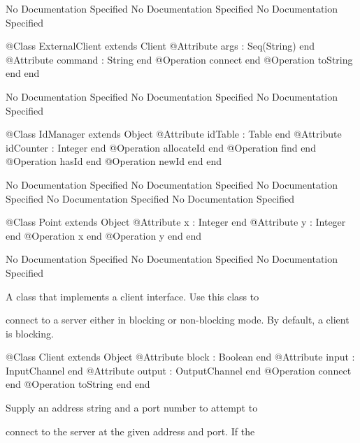 No Documentation Specified
No Documentation Specified
No Documentation Specified
\begin{Interface}
@Class ExternalClient extends Client
  @Attribute args : Seq(String) end
  @Attribute command : String end
  @Operation connect end
  @Operation toString end
end
\end{Interface}
No Documentation Specified
No Documentation Specified
No Documentation Specified
\begin{Interface}
@Class IdManager extends Object
  @Attribute idTable : Table end
  @Attribute idCounter : Integer end
  @Operation allocateId end
  @Operation find end
  @Operation hasId end
  @Operation newId end
end
\end{Interface}
No Documentation Specified
No Documentation Specified
No Documentation Specified
No Documentation Specified
No Documentation Specified
\begin{Interface}
@Class Point extends Object
  @Attribute x : Integer end
  @Attribute y : Integer end
  @Operation x end
  @Operation y end
end
\end{Interface}
No Documentation Specified
No Documentation Specified
No Documentation Specified

       A class that implements a client interface. Use this class to

       connect to a server either in blocking or non-blocking mode.
       By default, a client is blocking.
\begin{Interface}
@Class Client extends Object
  @Attribute block : Boolean end
  @Attribute input : InputChannel end
  @Attribute output : OutputChannel end
  @Operation connect end
  @Operation toString end
end
\end{Interface}

        Supply an address string and a port number to attempt to

        connect to the server at the given address and port. If the

